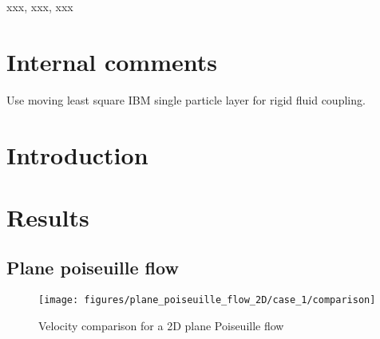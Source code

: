 \documentclass[preprint,12pt]{elsarticle}
\begin{document}
\begin{frontmatter}

  \title{}
  \author[XXX]{Dinesh Adepu}
  \author[XXX]{Pawan Negi }
  \author[University of Surrey]{Chuan Yu Wu}
\address[xxx]{xxx}



\begin{abstract}
\end{abstract}

\begin{keyword}
{xxx}, {xxx}, {xxx}


\end{keyword}

\end{frontmatter}


\section{Internal comments}
\label{sec:intro}
Use moving least square IBM single particle layer for rigid fluid coupling.

\section{Introduction}
\label{sec:intro}



\FloatBarrier%
\section{Results}
\label{sec:results}


\FloatBarrier%
\subsection{Plane poiseuille flow}
\label{sec:res:ppf}

\begin{figure}[!htpb]
  \centering
  \texttt{[image: figures/plane\_poiseuille\_flow\_2D/case\_1/comparison]}
  \caption{Velocity comparison for a 2D plane Poiseuille flow}
\label{fig:plane_poiseuille_flow_2D-case_1-comparison}
\end{figure}
\end{document}
